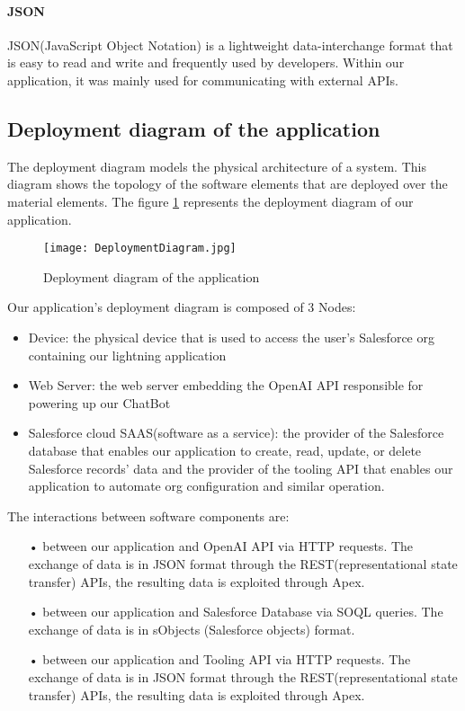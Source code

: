 \paragraph*{JSON}
JSON(JavaScript Object Notation) is a lightweight data-interchange format that is easy to read and write and
frequently used by developers. Within our application, it was mainly used for communicating with external APIs. 
\subsection{Deployment diagram of the application}
The deployment diagram models the physical architecture of a system.
This diagram shows the topology of the software elements that are deployed over the material elements.
The figure \ref{deploymentdiagram} represents the deployment diagram of our application.
\begin{figure}[H]%
    \center   
    \texttt{[image: DeploymentDiagram.jpg]}
    \caption{Deployment diagram of the application}
    \label{deploymentdiagram}
\end{figure}
Our application's deployment diagram is composed of 3 Nodes:
\begin{itemize}
\item Device: the physical device that is used to access the user's Salesforce org containing our lightning application
\item Web Server: the web server embedding the OpenAI API responsible for powering up our ChatBot 
\item Salesforce cloud SAAS(software as a service): the provider of the Salesforce database that enables our application to create, read, update, or delete Salesforce records' data and the provider of the tooling API that enables our application to automate org configuration and similar operation.  
\end{itemize}
The interactions between software components are:
\begin{itemize}
\item[•] between our application and OpenAI API via HTTP requests. The exchange of data is in JSON format through the
REST(representational state transfer) APIs, the resulting data is exploited through Apex.
\item[•] between our application and Salesforce Database via SOQL queries. The exchange of data is in sObjects (Salesforce objects) format.
\item[•] between our application and Tooling API via HTTP requests. The exchange of data is in JSON format through the
REST(representational state transfer) APIs, the resulting data is exploited through Apex.

\end{itemize}

